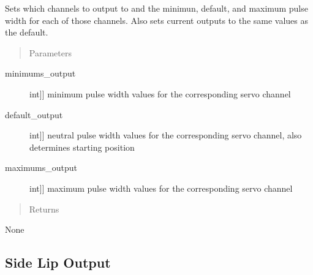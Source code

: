 \documentclass[letterpaper,10pt,english]{sphinxmanual}
\begin{document}
\begin{fulllineitems}
\begin{fulllineitems}
\end{fulllineitems}


\begin{fulllineitems}
\label{\detokenize{specific:EyebrowsOutput.EyebrowsOutput.set_outputs}}
\sphinxAtStartPar
Sets which channels to output to and the minimun, default, and maximum pulse width for each of those channels.
Also sets current outputs to the same values as the default.
\begin{quote}\begin{description}
\item[{Parameters}] \leavevmode
\end{description}\end{quote}
\begin{description}
\item[{minimums\_output}] \leavevmode{[}{[}int{]}{]}
\sphinxAtStartPar
minimum pulse width values for the corresponding servo channel

\item[{default\_output}] \leavevmode{[}{[}int{]}{]}
\sphinxAtStartPar
neutral pulse width values for the corresponding servo channel, also determines starting position

\item[{maximums\_output}] \leavevmode{[}{[}int{]}{]}
\sphinxAtStartPar
maximum pulse width values for the corresponding servo channel

\end{description}
\begin{quote}\begin{description}
\item[{Returns}] \leavevmode
\end{description}\end{quote}

\sphinxAtStartPar
None

\end{fulllineitems}


\end{fulllineitems}



\subsection{Side Lip Output}
\label{\detokenize{specific:module-SideLipOutput}}\label{\detokenize{specific:side-lip-output}}
\end{document}
